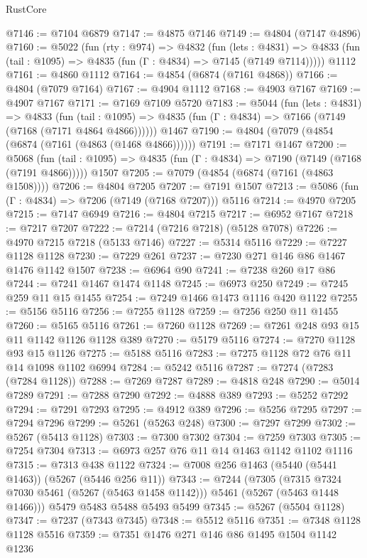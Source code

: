 \begin{lexlean}{RustCore}
\begin{coremodule}
@7146 := @7104 @6879
@7147 := @4875 @7146
@7149 := @4804 (@7147 @4896)
@7160 := @5022
    (fun (rty : @974) =>
    @4832
      (fun (lets : @4831) =>
      @4833 (fun (tail : @1095) => @4835 (fun (Γ : @4834) => @7145 (@7149 @7114)))))
    @1112
@7161 := @4860 @1112
@7164 := @4854 (@6874 (@7161 @4868))
@7166 := @4804 (@7079 @7164)
@7167 := @4904 @1112
@7168 := @4903 @7167
@7169 := @4907 @7167
@7171 := @7169 @7109 @5720
@7183 := @5044
    (fun (lets : @4831) =>
    @4833
      (fun (tail : @1095) => @4835 (fun (Γ : @4834) => @7166 (@7149 (@7168 (@7171 @4864 @4866))))))
    @1467
@7190 := @4804 (@7079 (@4854 (@6874 (@7161 (@4863 (@1468 @4866))))))
@7191 := @7171 @1467
@7200 := @5068
    (fun (tail : @1095) => @4835 (fun (Γ : @4834) => @7190 (@7149 (@7168 (@7191 @4866)))))
    @1507
@7205 := @7079 (@4854 (@6874 (@7161 (@4863 @1508))))
@7206 := @4804 @7205
@7207 := @7191 @1507
@7213 := @5086 (fun (Γ : @4834) => @7206 (@7149 (@7168 @7207))) @5116
@7214 := @4970 @7205
@7215 := @7147 @6949
@7216 := @4804 @7215
@7217 := @6952 @7167
@7218 := @7217 @7207
@7222 := @7214 (@7216 @7218) (@5128 @7078)
@7226 := @4970 @7215 @7218 (@5133 @7146)
@7227 := @5314 @5116
@7229 := @7227 @1128 @1128
@7230 := @7229 @261
@7237 := @7230 @271 @146 @86 @1467 @1476 @1142 @1507
@7238 := @6964 @90
@7241 := @7238 @260 @17 @86
@7244 := @7241 @1467 @1474 @1148
@7245 := @6973 @250
@7249 := @7245 @259 @11 @15 @1455
@7254 := @7249 @1466 @1473 @1116 @420 @1122
@7255 := @5156 @5116
@7256 := @7255 @1128
@7259 := @7256 @250 @11 @1455
@7260 := @5165 @5116
@7261 := @7260 @1128
@7269 := @7261 @248 @93 @15 @11 @1142 @1126 @1128 @389
@7270 := @5179 @5116
@7274 := @7270 @1128 @93 @15 @1126
@7275 := @5188 @5116
@7283 := @7275 @1128 @72 @76 @11 @14 @1098 @1102 @6994
@7284 := @5242 @5116
@7287 := @7274 (@7283 (@7284 @1128))
@7288 := @7269 @7287
@7289 := @4818 @248
@7290 := @5014 @7289
@7291 := @7288 @7290
@7292 := @4888 @389
@7293 := @5252 @7292
@7294 := @7291 @7293
@7295 := @4912 @389
@7296 := @5256 @7295
@7297 := @7294 @7296
@7299 := @5261 (@5263 @248)
@7300 := @7297 @7299
@7302 := @5267 (@5413 @1128)
@7303 := @7300 @7302
@7304 := @7259 @7303
@7305 := @7254 @7304
@7313 := @6973 @257 @76 @11 @14 @1463 @1142 @1102 @1116
@7315 := @7313 @438 @1122
@7324 := @7008 @256 @1463 (@5440 (@5441 @1463)) (@5267 (@5446 @256 @11))
@7343 := @7244
    (@7305 (@7315 @7324 @7030 @5461 (@5267 (@5463 @1458 @1142))) @5461 (@5267 (@5463 @1448 @1466)))
    @5479
    @5483
    @5488
    @5493
    @5499
@7345 := @5267 (@5504 @1128)
@7347 := @7237 (@7343 @7345)
@7348 := @5512 @5116
@7351 := @7348 @1128 @1128 @5516
@7359 := @7351 @1476 @271 @146 @86 @1495 @1504 @1142 @1236

\end{coremodule}
\end{lexlean}
